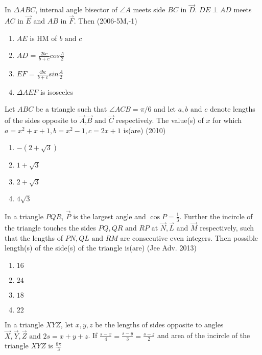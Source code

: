     \item In $\Delta ABC$, internal angle bisector of $\angle A$ meets side $BC$ in $\vec{D}$. $DE \perp AD$ meets $AC$ in $\vec{E}$ and $AB$ in $\vec{F}$. Then
    \hfill{(2006-5M,-1)}
    \begin{enumerate}
    	\item $AE$ is HM of $b \text{ and } c$
    	\item $AD$ = ${\frac{2bc}{b+c}}cos{\frac{A}{2}}$
    	\item $EF$ = ${\frac{4bc}{b+c}}sin{\frac{A}{2}}$
    	\item $\Delta AEF$ is isosceles
    \end{enumerate}
    \item Let $ABC$ be a triangle such that $\angle ACB = \pi/6$ and let $a,b \text{ and } c$ denote lengths of the sides opposite to $\vec{A}$,$\vec{B} \text{ and } \vec{C}$ respectively. The value(s) of $x$ for which $a = x^{2}+x+1, b = x^{2}-1, c = 2x+1$ is(are)
    \hfill{(2010)}
    \begin{multicols}{2}
    	\begin{enumerate}
    		\item $-(2+\sqrt{3})$
    		\item $1+\sqrt{3}$
    		\item $2+\sqrt{3}$
    		\item $4\sqrt{3}$
    	\end{enumerate}
    \end{multicols}
    \item In a triangle $PQR$, $\vec{P}$ is the largest angle and $\cos{P} = \frac{1}{3}$. Further the incircle of the triangle touches the sides $PQ,QR \text{ and } RP$ at $\vec{N},\vec{L} \text{ and } \vec{M}$ respectively, such that the lengths of $PN, QL \text{ and } RM$ are consecutive even integers. Then possible length(s) of the side(s) of the triangle is(are)
    \hfill{(Jee Adv. 2013)}
    \begin{multicols}{2}
    	\begin{enumerate}
    		\item $16$
    		\item $24$
    		\item $18$
    		\item $22$
    	\end{enumerate}
    \end{multicols}
    \item In a triangle $XYZ$, let $x,y,z$ be the lengths of sides opposite to angles $\vec{X},\vec{Y},\vec{Z} \text{ and } 2s = x+y+z$. If ${\frac{s-x}{4}}={\frac{s-y}{3}}={\frac{s-z}{2}}$ and area of the incircle of the triangle $XYZ$ is ${\frac{8\pi}{3}}$
